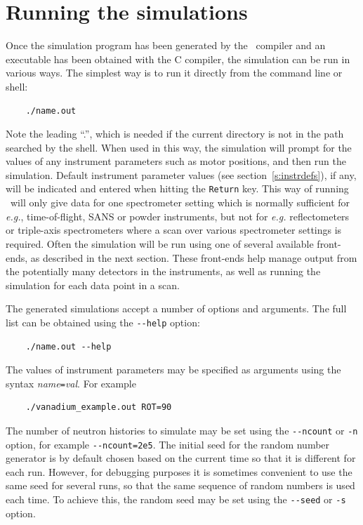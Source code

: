 \section{Running the simulations}
\label{s:run-sim}

Once the simulation program has been generated by the \MCS\ compiler
and an executable has been obtained with the C compiler, the simulation
can be run in various ways. The simplest way is to run it directly from the
command line or shell:
\begin{verbatim}
    ./name.out
\end{verbatim}
Note the leading ``.'', which is needed if the current directory is not in
the path searched by the shell. When used in this way, the simulation
will prompt for the values of any instrument parameters such as motor
positions, and then run the simulation. Default instrument parameter values (see section~\ref{s:instrdefs}), if any, will be indicated and entered when hitting the \verb+Return+ key.
This way of running \MCS\ will only give data for one spectrometer
setting which is normally sufficient for {\em e.g.}, time-of-flight,
SANS or powder instruments, but not for {\em e.g.} reflectometers or triple-axis spectrometers where a scan over
various spectrometer settings is required.
Often the simulation will be run using one of several
available front-ends, as described in the next section. These front-ends
help manage output from the potentially many detectors in the
instruments, as well as running the simulation for each data point in
a scan.

The generated simulations accept a number of options and arguments. The
full list can be obtained using the \verb+--help+ option:
\begin{verbatim}
    ./name.out --help
\end{verbatim}
The values of instrument parameters may be specified as arguments using
the syntax \textit{name}\verb+=+\textit{val}. For example
\begin{verbatim}
    ./vanadium_example.out ROT=90
\end{verbatim}
The number of neutron histories to simulate may be set using the
\verb+--ncount+ or \verb+-n+ option, for example
\verb+--ncount=2e5+. The initial seed for the random number generator is
by default chosen based on the current time so that it is different for
each run. However, for debugging purposes it is sometimes convenient to
use the same seed for several runs, so that the same sequence of random
numbers is used each time. To achieve this, the random seed may be set
using the \verb+--seed+ or \verb+-s+ option.

